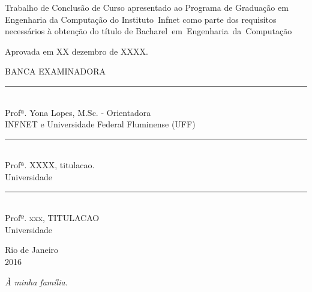\noindent
\begin{flushright}
\begin{minipage}[t]{8cm} 

Trabalho de Conclusão de Curso apresentado ao Programa de Graduação em Engenharia da Computação do \mbox{Instituto Infnet} como parte dos requisitos
necessários à obtenção do título de \mbox{Bacharel em Engenharia da Computação}

\end{minipage}
\end{flushright}
\vspace{ 5mm}  %
\noindent
Aprovada em XX dezembro de XXXX. \\
\begin{flushright}
  \parbox{15cm}
  {
  \begin{center}
  BANCA EXAMINADORA \\
  \vspace{5mm}
  \rule{11cm}{.1mm} \\
	Profª. Yona Lopes, M.Sc. - Orientadora \\ 
	INFNET e Universidade Federal Fluminense (UFF) \\
  \vspace{5mm}
  \rule{11cm}{.1mm} \\
    Profª. XXXX, titulacao.  \\
    Universidade \\
  \vspace{5mm}
  \rule{11cm}{.1mm} \\
    Profº. xxx, TITULACAO \\
    Universidade\\
  \end{center}
  }
\end{flushright}
\begin{center}
  \vspace{4mm} %
 Rio de Janeiro \\
  2016
\end{center}

\cleardoublepage
\thispagestyle{empty}
\vspace*{200mm}

\begin{flushright}
{\em 
À minha família.
}
\end{flushright}
\newpage


